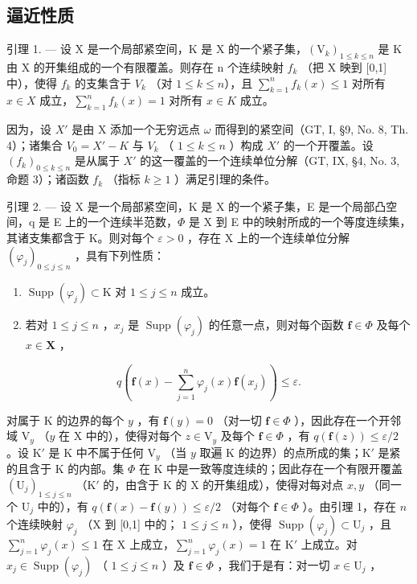\subsection{逼近性质}

引理 1. --- 设 X 是一个局部紧空间，K 是 X 的一个紧子集，\((\mathrm{V}_{k})_{1\leqslant k\leqslant n}\) 是 K 由 X 的开集组成的一个有限覆盖。则存在 n 个连续映射 \(f_{k}\) （把 X 映到 {[}0,1{]} 中），使得 \(f_{k}\) 的支集含于 \(V_{k}\) （对 \(1\leqslant k\leqslant n\)），且 \(\sum_{k=1}^{n}f_{k}(x)\leqslant1\) 对所有 \(x\in X\) 成立，\(\sum_{k=1}^{n}f_{k}(x)=1\) 对所有 \(x\in K\) 成立。

因为，设 \(X'\) 是由 X 添加一个无穷远点 \(\omega\) 而得到的紧空间（GT, I, §9, No. 8, Th. 4）；诸集合 \(V_{0} = X' - K\) 与 \(V_{k}\) （ \(1 \leqslant k \leqslant n\) ）构成 \(X'\) 的一个开覆盖。设 \((f_{k})_{0 \leqslant k \leqslant n}\) 是从属于 \(X'\) 的这一覆盖的一个连续单位分解（GT, IX, §4, No. 3, 命题 3）；诸函数 \(f_{k}\) （指标 \(k \geqslant 1\) ）满足引理的条件。

引理 2. --- 设 X 是一个局部紧空间，K 是 X 的一个紧子集，E 是一个局部凸空间，q 是 E 上的一个连续半范数，\(\Phi\) 是 X 到 E 中的映射所成的一个等度连续集，其诸支集都含于 K。则对每个 \(\varepsilon > 0\) ，存在 X 上的一个连续单位分解 \((\varphi_{j})_{0 \leqslant j \leqslant n}\) ，具有下列性质：

\begin{enumerate}
\def\labelenumi{(\roman{enumi})}
\item
  \(\operatorname{Supp}(\varphi_j) \subset \mathrm{K}\) 对 \(1 \leqslant j \leqslant n\) 成立。
\item
  若对 \(1 \leqslant j \leqslant n\) ，\(x_j\) 是 \(\operatorname{Supp}(\varphi_j)\) 的任意一点，则对每个函数 \(\mathbf{f} \in \Phi\) 及每个 \(x \in \mathbf{X}\) ，
\end{enumerate}

\[
q \left(\mathbf {f} (x) - \sum_ {j = 1} ^ {n} \varphi_ {j} (x) \mathbf {f} \left(x _ {j}\right)\right) \leqslant \varepsilon .\tag{1}
\]

对属于 K 的边界的每个 \(y\) ，有 \(\mathbf{f}(y) = 0\) （对一切 \(\mathbf{f} \in \Phi\) ），因此存在一个开邻域 \(\mathrm{V}_y\) （\(y\) 在 X 中的），使得对每个 \(z \in \mathrm{V}_y\) 及每个 \(\mathbf{f} \in \Phi\) ，有 \(q(\mathbf{f}(z)) \leqslant \varepsilon / 2\) 。设 \(\mathrm{K}'\) 是 K 中不属于任何 \(\mathrm{V}_y\) （当 \(y\) 取遍 K 的边界）的点所成的集；\(\mathrm{K}'\) 是紧的且含于 K 的内部。集 \(\Phi\) 在 K 中是一致等度连续的；因此存在一个有限开覆盖 \((\mathrm{U}_j)_{1 \leqslant j \leqslant n}\) （\(\mathrm{K}'\) 的，由含于 K 的 X 的开集组成），使得对每对点 \(x, y\) （同一个 \(\mathrm{U}_j\) 中的），有 \(q(\mathbf{f}(x) - \mathbf{f}(y)) \leqslant \varepsilon / 2\) （对每个 \(\mathbf{f} \in \Phi\) ）。由引理 1，存在 \(n\) 个连续映射 \(\varphi_j\) （X 到 {[}0,1{]} 中的； \(1 \leqslant j \leqslant n\) ），使得 \(\operatorname{Supp}(\varphi_j) \subset \mathrm{U}_j\) ，且 \(\sum_{j=1}^{n} \varphi_j(x) \leqslant 1\) 在 X 上成立，\(\sum_{j=1}^{n} \varphi_j(x) = 1\) 在 \(\mathrm{K}'\) 上成立。对 \(x_j \in \operatorname{Supp}(\varphi_j)\) （ \(1 \leqslant j \leqslant n\) ）及 \(\mathbf{f} \in \Phi\) ，我们于是有：对一切 \(x \in \mathrm{U}_j\) ，

